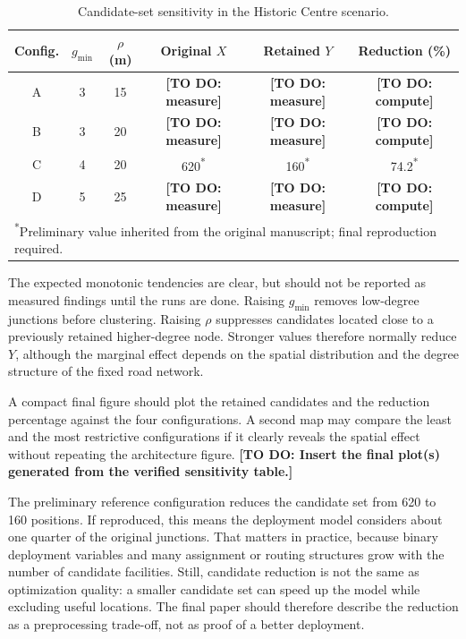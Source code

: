 \documentclass[engproc,proceedingpaper,submit,oneauthor]{Definitions/mdpi}
\newcommand{\todo}[1]{{\color{todored}\textbf{[TO DO: #1]}}}
\begin{document}
	\begin{table}[H]
		\centering
		\caption{Candidate-set sensitivity in the Historic Centre scenario.}
		\label{tab:sensitivity}
		\begin{tabular}{cccccc}
			\toprule
			Config. & $g_{\min}$ & $\rho$ (m) & Original $X$ & Retained $Y$ & Reduction (\%)\\
			\midrule
			A & 3 & 15 & \todo{measure} & \todo{measure} & \todo{compute}\\
			B & 3 & 20 & \todo{measure} & \todo{measure} & \todo{compute}\\
			C & 4 & 20 & 620\textsuperscript{*} & 160\textsuperscript{*} & 74.2\textsuperscript{*}\\
			D & 5 & 25 & \todo{measure} & \todo{measure} & \todo{compute}\\
			\bottomrule
			\multicolumn{6}{l}{\footnotesize \textsuperscript{*}Preliminary value inherited from
				the original manuscript; final reproduction required.}
		\end{tabular}
	\end{table}
	
	The expected monotonic tendencies are clear, but should not be reported as measured
	findings until the runs are done. Raising $g_{\min}$ removes low-degree junctions
	before clustering. Raising $\rho$ suppresses candidates located close to a previously
	retained higher-degree node. Stronger values therefore normally reduce $Y$, although
	the marginal effect depends on the spatial distribution and the degree structure of
	the fixed road network.
	
	A compact final figure should plot the retained candidates and the reduction
	percentage against the four configurations. A second map may compare the least and
	the most restrictive configurations if it clearly reveals the spatial effect without
	repeating the architecture figure. \todo{Insert the final plot(s) generated from the
		verified sensitivity table.}
	
	The preliminary reference configuration reduces the candidate set from 620 to 160
	positions. If reproduced, this means the deployment model considers about one quarter
	of the original junctions. That matters in practice, because binary deployment
	variables and many assignment or routing structures grow with the number of candidate
	facilities. Still, candidate reduction is not the same as optimization quality: a
	smaller candidate set can speed up the model while excluding useful locations. The
	final paper should therefore describe the reduction as a preprocessing trade-off, not
	as proof of a better deployment.
	
\end{document}
